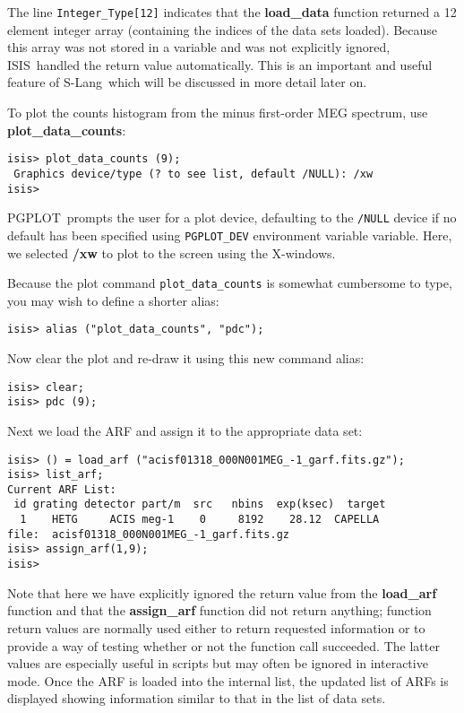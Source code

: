 \documentclass{book}
\newcommand{\isisx}{{\sc ISIS~}}
\newcommand{\pgplot}{{\sc PGPLOT}}
\newcommand{\slang}{{\sc S-Lang}}
\begin{document}
The line \verb|Integer_Type[12]| indicates that the {\bf
load\_data} function returned a 12 element integer array
(containing the indices of the data sets loaded).  Because this
array was not stored in a variable and was not explicitly ignored,
\isisx handled the return value automatically.  This is an
important and useful feature of \slang\ which will be discussed in
more detail later on.

To plot the counts histogram from the minus first-order MEG
spectrum, use {\bf plot\_data\_counts}:
\begin{verbatim}
isis> plot_data_counts (9);
 Graphics device/type (? to see list, default /NULL): /xw
isis>
\end{verbatim}
\pgplot\ prompts the user for a plot device, defaulting to
the {\tt /NULL} device if no default has been specified
using {\tt PGPLOT\_DEV} environment
variable variable.  Here, we selected {\bf /xw} to plot to the
screen using the X-windows.

Because the plot command {\tt plot\_data\_counts} is somewhat
cumbersome to type, you may wish to define a shorter alias:
\begin{verbatim}
isis> alias ("plot_data_counts", "pdc");
\end{verbatim}
Now clear the plot and re-draw it using this new command alias:
\begin{verbatim}
isis> clear;
isis> pdc (9);
\end{verbatim}

Next we load the ARF and assign it to the appropriate data set:
\begin{verbatim}
isis> () = load_arf ("acisf01318_000N001MEG_-1_garf.fits.gz");
isis> list_arf;
Current ARF List:
 id grating detector part/m  src   nbins  exp(ksec)  target
  1    HETG     ACIS meg-1    0     8192    28.12  CAPELLA
file:  acisf01318_000N001MEG_-1_garf.fits.gz
isis> assign_arf(1,9);
isis>
\end{verbatim}
Note that here we have explicitly ignored the return value from the
{\bf load\_arf} function and that the {\bf assign\_arf} function did
not return anything;  function return values are normally used
either to return requested information or to provide a way of testing
whether or not the function call succeeded.  The latter values are
especially useful in scripts but may often be ignored in interactive mode.
Once the ARF is loaded into the internal list, the updated list of ARFs
is displayed showing information similar to that in the list of
data sets.
\end{document}
